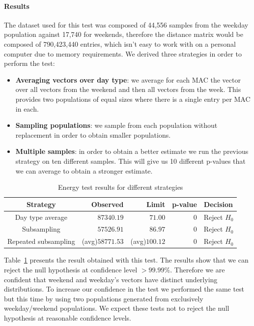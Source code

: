 \paragraph{Results}
The dataset used for this test was composed of 44,556 samples from the weekday population against 17,740 for weekends, therefore the distance matrix would be composed of 790,423,440 entries, which isn't easy to work with on a personal computer due to memory requirements. We derived three strategies in order to perform the test:
\begin{itemize}
	\item \textbf{Averaging vectors over day type}: we average for each MAC the vector over all vectors from the weekend and then all vectors from the week. This provides two populations of equal sizes where there is a single entry per MAC in each.
	\item \textbf{Sampling populations}: we sample from each population without replacement in order to obtain smaller populations. 
	\item \textbf{Multiple samples}: in order to obtain a better estimate we run the previous strategy on ten different samples. This will give us 10 different p-values that we can average to obtain a stronger estimate.
\end{itemize}

\begin{table}[h]
\begin{center}
\begin{tabular}{c r r r l}
\hline
\textbf{Strategy} & \textbf{Observed} & \textbf{Limit} & \textbf{p-value} & \textbf{Decision}\\ 
\hline\hline
Day type average &  $87340.19$ & $71.00$ & $0$ & Reject $H_0$\\
\hline
Subsampling &  $57526.91$ & $86.97$ & $0$ &  Reject $H_0$\\
\hline
Repeated subsampling &  (avg)$58771.53$  & (avg)$100.12$ & $0$ &  Reject $H_0$\\
\end{tabular}
\end{center}
\caption{\label{hyp_test_res}Energy test results for different strategies}
\end{table}

Table~\ref{hyp_test_res} presents the result obtained with this test. The results show that we can reject the null hypothesis at confidence level $>99.99\%$. Therefore we are confident that weekend and weekday's vectors have distinct underlying distributions. To increase our confidence in the test we performed the same test but this time by using two populations generated from exclusively weekday/weekend populations. We expect these tests not to reject the null hypothesis at reasonable confidence levels.

